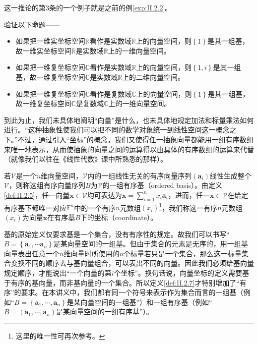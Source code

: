 \documentclass[../main.tex]{subfiles}
\begin{document}
这一推论的第3条的一个例子就是之前的例\ref{exp:II.2.2}。

\begin{example}
    验证以下命题——
    \begin{itemize}
        \item 如果把一维实坐标空间$\mathbb{R}$看作是实数域$\mathbb{R}$上的向量空间，则$\left\{1\right\}$是其一组基，故一维实坐标空间$\mathbb{R}$是实数域$\mathbb{R}$上的一维向量空间。
        \item 如果把一维复坐标空间$\mathbb{C}$看作是实数域$\mathbb{R}$上的向量空间，则$\left\{1,i\right\}$是其一组基，故一维复坐标空间$\mathbb{C}$是实数域$\mathbb{R}$上的二维向量空间。
        \item 如果把一维复坐标空间$\mathbb{C}$看作是复数域$\mathbb{C}$上的向量空间，则$\left\{1\right\}$是其一组基，故一维复坐标空间$\mathbb{C}$是复数域$\mathbb{C}$上的一维向量空间。
    \end{itemize}
\end{example}

到此为止，我们未具体地阐明“向量”是什么，也未具体地规定加法和标量乘法如何进行。“这种抽象性使我们可以把不同的数学对象统一到线性空间这一概念之下。”\cite[p.~167]{周胜林2012线性代数}不过，通过引入“坐标”的概念，我们又使得任一抽象向量都能用一组有序数组来唯一地表示，从而使抽象的向量之间的运算得以由具体的有序数组的运算来代替（就像我们以往在《线性代数》课中所熟悉的那样）。

\begin{definition}[向量在给定有序基下的坐标]\label{def:II.2.7}若$\mathcal{V}$是一个$n$维向量空间，$\mathcal{V}$内的一组线性无关的有序向量序列$\left(\mathbf{a}_i\right)$线性生成整个$\mathcal{V}$，则称这组有序向量序列$B$为$\mathcal{V}$的一组有序基（ordered basis）。由定义\ref{def:II.2.5}，任一向量$\mathbf{x}\in\mathcal{V}$均可表达为$\mathbf{x}=\sum_{i=1}^nx_i\mathbf{a}_i$，进而，任一$\mathbf{x}\in\mathcal{V}$在给定有序基下都唯一对应$\mathbb{F}^n$中的一个有序$n$元数组$\left(x_i\right)$\footnote{这里的唯一性可再次参考\cite[“(3)的证明”，p.~171]{周胜林2012线性代数}。}，我们称这一有序$n$元数组$\left(x_i\right)$为向量$\mathbf{x}$在有序基$B$下的坐标（coordinate）。
\end{definition}

基的原始定义仅要求基是一个集合，没有有序性的规定。故我们可以书写“$B=\left\{\mathbf{a}_1,\cdots\mathbf{a}_n\right\}$是某向量空间的一组基。但由于集合的元素是无序的，用一组基向量表出任意一个$n$维向量时所使用的$n$个标量若只是一个集合，那么这一标量集合变换不同的顺序去与基向量组合，可以表出不同的向量。因此我们必须给基向量规定顺序，才能说出“一个向量的第$i$个坐标”。换句话说，向量坐标的定义需要基于有序的基向量，而非基向量的一个集合。所以定义\ref{def:II.2.7}才特别增加了“有序”的要求。在本讲义中，我们都有同一个符号来表示作为集合而言的一组基（例如“$B=\left\{\mathbf{a}_1,\cdots,\mathbf{a}_n\right\}$是某向量空间的一组基”）和一组有序基（例如“$B=\left(\mathbf{a}_1,\cdots,\mathbf{a}_n\right)$是某向量空间的一组有序基”）。
\end{document}
